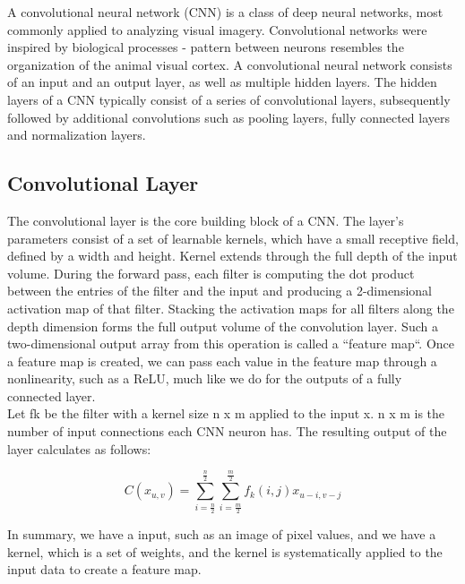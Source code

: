 A convolutional neural network (CNN) is a class of deep neural networks, most commonly applied to analyzing visual imagery. Convolutional networks were inspired by biological processes - pattern between neurons resembles the organization of the animal visual cortex. A convolutional neural network consists of an input and an output layer, as well as multiple hidden layers. The hidden layers of a CNN typically consist of a series of convolutional layers, subsequently followed by additional convolutions such as pooling layers, fully connected layers and normalization layers.\\

\subsection{Convolutional Layer}
The convolutional layer is the core building block of a CNN. The layer's parameters consist of a set of learnable kernels, which have a small receptive field, defined by a width and height. Kernel extends through the full depth of the input volume. During the forward pass, each filter is computing the dot product between the entries of the filter and the input and producing a 2-dimensional activation map of that filter. Stacking the activation maps for all filters along the depth dimension forms the full output volume of the convolution layer. Such a two-dimensional output array from this operation is called a “feature map“. Once a feature map is created, we can pass each value in the feature map through a nonlinearity, such as a ReLU, much like we do for the outputs of a fully connected layer.
\\Let fk be the filter with a kernel size n x m applied to the input x. n x m is the number of input connections each CNN neuron has. The resulting output of the layer calculates as follows:
\begin{large}
    $$C(x_{u,v}) = \sum_{i = \frac{n}{2}}^{\frac{n}{2}} \sum_{i = \frac{m}{2}}^{\frac{m}{2}} f_{k}(i, j)x_{u-i,v-j} $$
\end{large}
In summary, we have a input, such as an image of pixel values, and we have a kernel, which is a set of weights, and the kernel is systematically applied to the input data to create a feature map.


